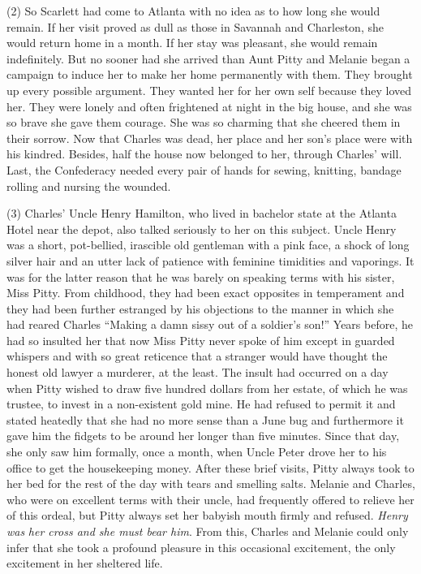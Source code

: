 \documentclass[UTF8,11pt]{ctexart}
\begin{document}
(2) So Scarlett had come to Atlanta with no idea as to how long she would remain. If her visit proved as dull as those in Savannah and Charleston, she would return home in a month. If her stay was pleasant, she would remain indefinitely. But no sooner had she arrived than Aunt Pitty and Melanie began a campaign to induce her to make her home permanently with them. They brought up every possible argument. They wanted her for her own self because they loved her. They were lonely and often frightened at night in the big house, and she was so brave she gave them courage. She was so charming that she cheered them in their sorrow. Now that Charles was dead, her place and her son’s place were with his kindred. Besides, half the house now belonged to her, through Charles’ will. Last, the Confederacy needed every pair of hands for sewing, knitting, bandage rolling and nursing the wounded.


(3) Charles’ Uncle Henry Hamilton, who lived in bachelor state at the Atlanta Hotel near the depot, also talked seriously to her on this subject. Uncle Henry was a short, pot-bellied, irascible old gentleman with a pink face, a shock of long silver hair and an utter lack of patience with feminine timidities and vaporings. It was for the latter reason that he was barely on speaking terms with his sister, Miss Pitty. From childhood, they had been exact opposites in temperament and they had been further estranged by his objections to the manner in which she had reared Charles “Making a damn sissy out of a soldier’s son!” Years before, he had so insulted her that now Miss Pitty never spoke of him except in guarded whispers and with so great reticence that a stranger would have thought the honest old lawyer a murderer, at the least. The insult had occurred on a day when Pitty wished to draw five hundred dollars from her estate, of which he was trustee, to invest in a non-existent gold mine. He had refused to permit it and stated heatedly that she had no more sense than a June bug and furthermore it gave him the fidgets to be around her longer than five minutes. Since that day, she only saw him formally, once a month, when Uncle Peter drove her to his office to get the housekeeping money. After these brief visits, Pitty always took to her bed for the rest of the day with tears and smelling salts. Melanie and Charles, who were on excellent terms with their uncle, had frequently offered to relieve her of this ordeal, but Pitty always set her babyish mouth firmly and refused. \textit{Henry was} \textit{her cross and she must bear him}. From this, Charles and Melanie could only infer that she took a profound pleasure in this occasional excitement, the only excitement in her sheltered life.
\end{document}
